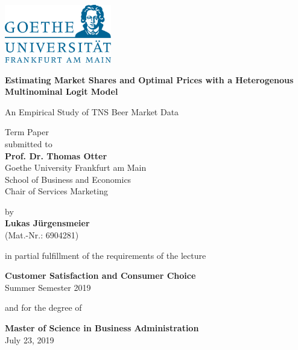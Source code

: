 \documentclass[12pt,a4paper]{article}
\begin{document}
\begin{center}
 \includegraphics[width=0.35\textwidth]{GU-Logo-blau-CMYK.eps} \vspace{2cm}
  
  {\Large{\bf Estimating Market Shares and Optimal Prices with a Heterogenous Multinominal Logit Model}} \medskip

  {\Large{An Empirical Study of TNS Beer Market Data}} \vspace{0.5cm}

  Term Paper \\\vspace{2cm}
  submitted to \\\vspace{0.5cm}
  \textbf{Prof. Dr. Thomas Otter} \\\vspace{0.5cm}
  Goethe University Frankfurt am Main \\
  School of Business and Economics \\
  Chair of Services Marketing \vspace{2cm}
  
  by \\\vspace{0.5cm}
  \textbf{Lukas J\"urgensmeier} \\
  (Mat.-Nr.: 6904281) \\
  
  \bigskip

  in partial fulfillment of the requirements of the lecture \medskip

 {\bf Customer Satisfaction and Consumer Choice} \\
  Summer Semester 2019\\
  \medskip

  and for the degree of \medskip

  \textbf{Master of Science in Business Administration} \\\vspace{0.5cm}
  July 23, 2019
  
\end{center}


\pagebreak
\pagestyle{plain}
\tableofcontents
\listoffigures
\listoftables
\newpage
\setcounter{page}{2}
\setlength{\baselineskip}{1.5\baselineskip}
\pagestyle{plain}
\end{document}
